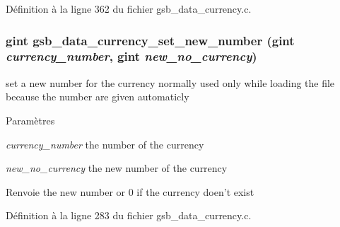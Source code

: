 Définition à la ligne 362 du fichier gsb\_\-data\_\-currency.c.

\subsubsection[{gsb\_\-data\_\-currency\_\-set\_\-new\_\-number}]{\setlength{\rightskip}{0pt plus 5cm}gint gsb\_\-data\_\-currency\_\-set\_\-new\_\-number (gint {\em currency\_\-number}, \/  gint {\em new\_\-no\_\-currency})}\label{gsb__data__currency_8c_a6a20f6117c3f5a7c86f276e98b37c0b6}
set a new number for the currency normally used only while loading the file because the number are given automaticly


\begin{DoxyParams}{Paramètres}
\item[{\em currency\_\-number}]the number of the currency \item[{\em new\_\-no\_\-currency}]the new number of the currency\end{DoxyParams}
\begin{DoxyReturn}{Renvoie}
the new number or 0 if the currency doen't exist 
\end{DoxyReturn}


Définition à la ligne 283 du fichier gsb\_\-data\_\-currency.c.

